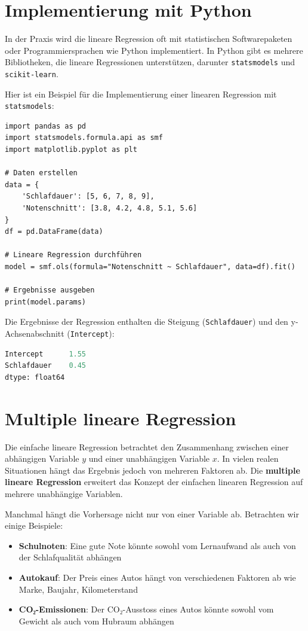 \section{Implementierung mit Python}

In der Praxis wird die lineare Regression oft mit statistischen Softwarepaketen oder Programmiersprachen wie Python implementiert. In Python gibt es mehrere Bibliotheken, die lineare Regressionen unterstützen, darunter \texttt{statsmodels} und \texttt{scikit-learn}.

Hier ist ein Beispiel für die Implementierung einer linearen Regression mit \texttt{statsmodels}:

\begin{lstlisting}
import pandas as pd
import statsmodels.formula.api as smf
import matplotlib.pyplot as plt

# Daten erstellen
data = {
    'Schlafdauer': [5, 6, 7, 8, 9],
    'Notenschnitt': [3.8, 4.2, 4.8, 5.1, 5.6]
}
df = pd.DataFrame(data)

# Lineare Regression durchführen
model = smf.ols(formula="Notenschnitt ~ Schlafdauer", data=df).fit()

# Ergebnisse ausgeben
print(model.params)
\end{lstlisting}

Die Ergebnisse der Regression enthalten die Steigung (\texttt{Schlafdauer}) und den y-Achsenabschnitt (\texttt{Intercept}):

\begin{lstlisting}[language=Python]
Intercept      1.55
Schlafdauer    0.45
dtype: float64
\end{lstlisting}

\section{Multiple lineare Regression}

Die einfache lineare Regression betrachtet den Zusammenhang zwischen einer abhängigen Variable $y$ und einer unabhängigen Variable $x$. In vielen realen Situationen hängt das Ergebnis jedoch von mehreren Faktoren ab. Die \textbf{multiple lineare Regression} erweitert das Konzept der einfachen linearen Regression auf mehrere unabhängige Variablen.

Manchmal hängt die Vorhersage nicht nur von einer Variable ab. Betrachten wir einige Beispiele:

\begin{itemize}
    \item \textbf{Schulnoten}: Eine gute Note könnte sowohl vom Lernaufwand als auch von der Schlafqualität abhängen
    \item \textbf{Autokauf}: Der Preis eines Autos hängt von verschiedenen Faktoren ab wie Marke, Baujahr, Kilometerstand
    \item \textbf{CO₂-Emissionen}: Der CO₂-Ausstoss eines Autos könnte sowohl vom Gewicht als auch vom Hubraum abhängen
\end{itemize}

